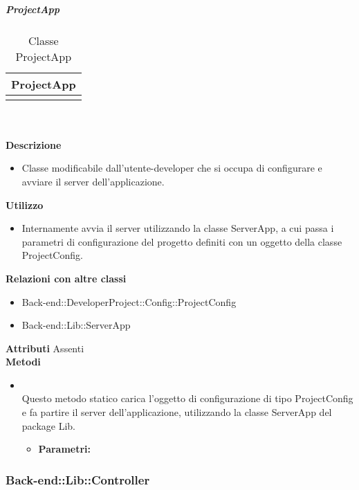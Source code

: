 			\subparagraph{ProjectApp} 
\begin{table}[ht]
\begin{center}
\bgroup
	\setlength{\arrayrulewidth}{0.6mm}
	\def\arraystretch{1}
		\begin{tabular}{ | p{12cm} | }
				\hline  
					\centerline{\textbf{ProjectApp}}
		\\ \hline 
				\hline
					\code{+\underline{start}()} \\ 
				\hline
		
		\end{tabular}
\egroup
\caption{Classe ProjectApp}
\end{center}
\end{table} \textbf{\\ \\ Descrizione}
\begin{itemize}
\item[] Classe modificabile dall'utente-developer che si occupa di configurare e avviare il server dell'applicazione.
\end{itemize} 
\textbf{Utilizzo}
\begin{itemize}
\item[] Internamente avvia il server utilizzando la classe ServerApp, a cui passa i parametri di configurazione del progetto definiti con un oggetto della classe ProjectConfig.
\end{itemize}
\textbf{Relazioni con altre classi}
\begin{itemize}
\item{Back-end::DeveloperProject::Config::ProjectConfig}
\item{Back-end::Lib::ServerApp}
\end{itemize}
\textbf{Attributi}
Assenti \\
\textbf{Metodi}
\begin{itemize}
\item[] \textbf{} \\ Questo metodo statico carica l'oggetto di configurazione di tipo ProjectConfig e fa partire il server dell'applicazione, utilizzando la classe ServerApp del package Lib.
\begin{itemize}\addtolength{\itemsep}{-0.5\baselineskip}
\item[] \textbf{Parametri:}
\end{itemize}
\end{itemize}

	\subsubsection{Back-end::Lib::Controller} 
